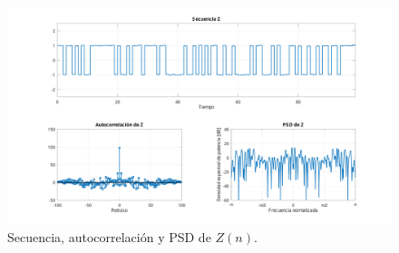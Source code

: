 \begin{figure}[h]
	\centering
	\includegraphics[width=1\linewidth]{img/ej3_z.pdf}
	\caption{Secuencia, autocorrelación y PSD de $Z(n)$.}
	\label{fig:ej3_z}
\end{figure}
